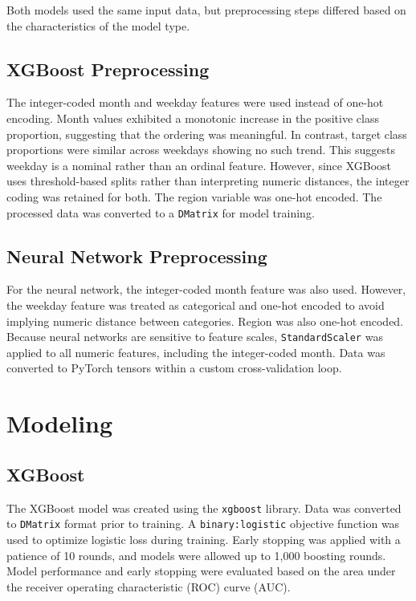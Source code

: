 \documentclass{article}
\begin{document}
Both models used the same input data, but preprocessing steps differed based on the characteristics of the model type.

\subsection{XGBoost Preprocessing}

The integer-coded month and weekday features were used instead of one-hot encoding. Month values exhibited a monotonic increase in the positive class proportion, suggesting that the ordering was meaningful. In contrast, target class proportions were similar across weekdays showing no such trend. This suggests weekday is a nominal rather than an ordinal feature. However, since XGBoost uses threshold-based splits rather than interpreting numeric distances, the integer coding was retained for both. The region variable was one-hot encoded. The processed data was converted to a \texttt{DMatrix} for model training.

\subsection{Neural Network Preprocessing}

For the neural network, the integer-coded month feature was also used. However, the weekday feature was treated as categorical and one-hot encoded to avoid implying numeric distance between categories. Region was also one-hot encoded. Because neural networks are sensitive to feature scales, \texttt{StandardScaler} was applied to all numeric features, including the integer-coded month. Data was converted to PyTorch tensors within a custom cross-validation loop.

\section{Modeling}

\subsection{XGBoost}

The XGBoost model was created using the \texttt{xgboost} library. Data was converted to \texttt{DMatrix} format prior to training. A \texttt{binary:logistic} objective function was used to optimize logistic loss during training. Early stopping was applied with a patience of 10 rounds, and models were allowed up to 1{,}000 boosting rounds. Model performance and early stopping were evaluated based on the area under the receiver operating characteristic (ROC) curve (AUC).
\end{document}
